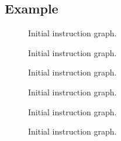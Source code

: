 \subsection{Example}

\begin{figure}
\begin{center}
\end{center}
\caption{\label{fig31}
Initial instruction graph.}
\end{figure}

\begin{figure}
\begin{center}
\end{center}
\caption{\label{fig32}
Initial instruction graph.}
\end{figure}

\begin{figure}
\begin{center}
\end{center}
\caption{\label{fig33}
Initial instruction graph.}
\end{figure}

\begin{figure}
\begin{center}
\end{center}
\caption{\label{fig34}
Initial instruction graph.}
\end{figure}

\begin{figure}
\begin{center}
\end{center}
\caption{\label{fig35}
Initial instruction graph.}
\end{figure}

\begin{figure}
\begin{center}
\end{center}
\caption{\label{fig36}
Initial instruction graph.}
\end{figure}


